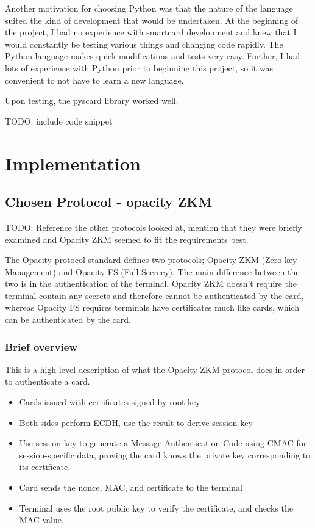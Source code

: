 \documentclass[12pt]{article}
\begin{document}
Another motivation for choosing Python was that the nature of the language suited the kind of development that would be undertaken. At the beginning of the project, I had no experience with smartcard development and knew that I would constantly be testing various things and changing code rapidly. The Python language makes quick modifications and tests very easy. Further, I had lots of experience with Python prior to beginning this project, so it was convenient to not have to learn a new language.

Upon testing, the pyscard library worked well.

TODO: include code snippet



\pagebreak
\section{Implementation}

\subsection{Chosen Protocol - opacity ZKM}
TODO: Reference the other protocols looked at, mention that they were briefly examined and Opacity ZKM seemed to fit the requirements best.

The Opacity protocol standard defines two protocols; Opacity ZKM (Zero key Management) and Opacity FS (Full Secrecy). The main difference between the two is in the authentication of the terminal. Opacity ZKM doesn't require the terminal contain any secrets and therefore cannot be authenticated by the card, whereas Opacity FS requires terminals have certificates much like cards, which can be authenticated by the card.

\subsubsection{Brief overview}
This is a high-level description of what the Opacity ZKM protocol does in order to authenticate a card.
\begin{itemize}
	\item Cards issued with certificates signed by root key
	\item Both sides perform ECDH, use the result to derive session key
	\item Use session key to generate a Message Authentication Code using CMAC for session-specific data, proving the card knows the private key corresponding to its certificate.
	\item Card sends the nonce, MAC, and certificate to the terminal
	\item Terminal uses the root public key to verify the certificate, and checks the MAC value.
\end{itemize}
\end{document}
